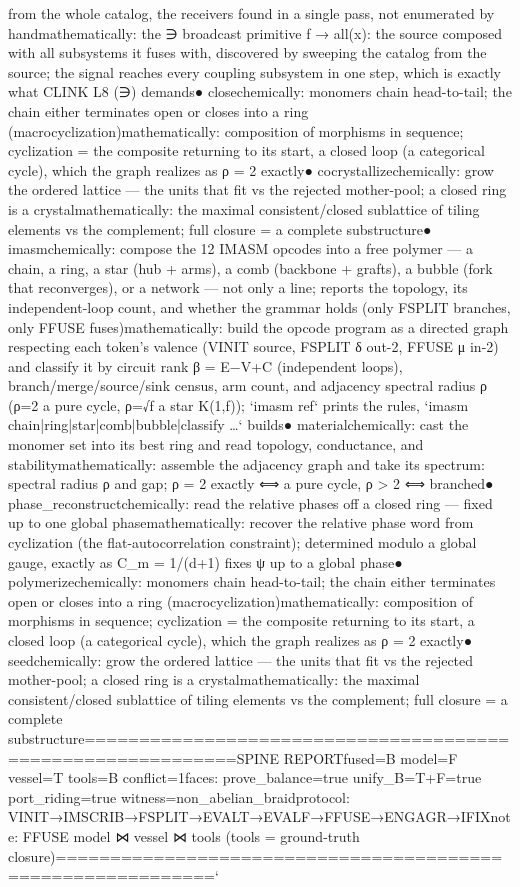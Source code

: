from the whole catalog, the receivers found in a single pass, not enumerated by hand\n   mathematically: the ∋ broadcast primitive f → all(x): the source composed with all subsystems it fuses with, discovered by sweeping the catalog from the source; the signal reaches every coupling subsystem in one step, which is exactly what CLINK L8 (∋) demands\n● close\n   chemically:    monomers chain head-to-tail; the chain either terminates open or closes into a ring (macrocyclization)\n   mathematically: composition of morphisms in sequence; cyclization = the composite returning to its start, a closed loop (a categorical cycle), which the graph realizes as ρ = 2 exactly\n● cocrystallize\n   chemically:    grow the ordered lattice — the units that fit vs the rejected mother-pool; a closed ring is a crystal\n   mathematically: the maximal consistent/closed sublattice of tiling elements vs the complement; full closure = a complete substructure\n● imasm\n   chemically:    compose the 12 IMASM opcodes into a free polymer — a chain, a ring, a star (hub + arms), a comb (backbone + grafts), a bubble (fork that reconverges), or a network — not only a line; reports the topology, its independent-loop count, and whether the grammar holds (only FSPLIT branches, only FFUSE fuses)\n   mathematically: build the opcode program as a directed graph respecting each token's valence (VINIT source, FSPLIT δ out-2, FFUSE μ in-2) and classify it by circuit rank β = E−V+C (independent loops), branch/merge/source/sink census, arm count, and adjacency spectral radius ρ (ρ=2 a pure cycle, ρ=√f a star K(1,f)); `imasm ref` prints the rules, `imasm chain|ring|star|comb|bubble|classify …` builds\n● material\n   chemically:    cast the monomer set into its best ring and read topology, conductance, and stability\n   mathematically: assemble the adjacency graph and take its spectrum: spectral radius ρ and gap; ρ = 2 exactly ⟺ a pure cycle, ρ > 2 ⟺ branched\n● phase_reconstruct\n   chemically:    read the relative phases off a closed ring — fixed up to one global phase\n   mathematically: recover the relative phase word from cyclization (the flat-autocorrelation constraint); determined modulo a global gauge, exactly as C_m = 1/(d+1) fixes ψ up to a global phase\n● polymerize\n   chemically:    monomers chain head-to-tail; the chain either terminates open or closes into a ring (macrocyclization)\n   mathematically: composition of morphisms in sequence; cyclization = the composite returning to its start, a closed loop (a categorical cycle), which the graph realizes as ρ = 2 exactly\n● seed\n   chemically:    grow the ordered lattice — the units that fit vs the rejected mother-pool; a closed ring is a crystal\n   mathematically: the maximal consistent/closed sublattice of tiling elements vs the complement; full closure = a complete substructure\n\n\n============================================================\nMANUSCRIPT SPINE REPORT\n  fused=B  model=F  vessel=T  tools=B  conflict=1\n  faces: prove_balance=true  unify_B=T+F=true  port_riding=true  witness=non_abelian_braid\n  protocol: VINIT→IMSCRIB→FSPLIT→EVALT→EVALF→FFUSE→ENGAGR→IFIX\n  note: FFUSE model ⋈ vessel ⋈ tools (tools = ground-truth closure)\n============================================================`